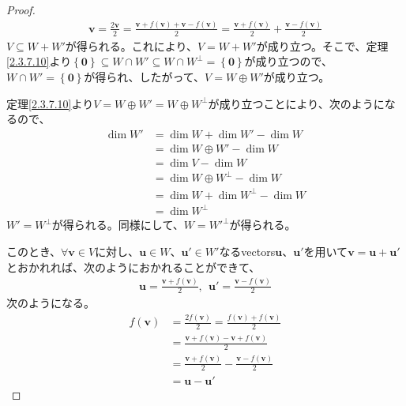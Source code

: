 \documentclass[dvipdfmx]{jsarticle}
\begin{document}
\begin{proof}
\begin{align*}
\mathbf{v} = \frac{2\mathbf{v}}{2} = \frac{\mathbf{v} + f\left( \mathbf{v} \right) + \mathbf{v} - f\left( \mathbf{v} \right)}{2} = \frac{\mathbf{v} + f\left( \mathbf{v} \right)}{2} + \frac{\mathbf{v} - f\left( \mathbf{v} \right)}{2}
\end{align*}
$V \subseteq W + W'$が得られる。これにより、$V = W + W'$が成り立つ。そこで、定理\ref{2.3.7.10}より$\left\{ \mathbf{0} \right\} \subseteq W \cap W' \subseteq W \cap W^{\bot} = \left\{ \mathbf{0} \right\}$が成り立つので、$W \cap W' = \left\{ \mathbf{0} \right\}$が得られ、したがって、$V = W \oplus W'$が成り立つ。\par
定理\ref{2.3.7.10}より$V = W \oplus W' = W \oplus W^{\bot}$が成り立つことにより、次のようになるので、
\begin{align*}
\dim W' &= \dim W + \dim W' - \dim W\\
&= \dim{W \oplus W'} - \dim W\\
&= \dim V - \dim W\\
&= \dim{W \oplus W^{\bot}} - \dim W\\
&= \dim W + \dim W^{\bot} - \dim W\\
&= \dim W^{\bot}
\end{align*}
$W' = W^{\bot}$が得られる。同様にして、$W = {W'}^{\bot}$が得られる。\par
このとき、$\forall\mathbf{v} \in V$に対し、$\mathbf{u} \in W$、$\mathbf{u}' \in W'$なるvectors$\mathbf{u}$、$\mathbf{u}'$を用いて$\mathbf{v} = \mathbf{u} + \mathbf{u}'$とおかれれば、次のようにおかれることができて、
\begin{align*}
\mathbf{u} = \frac{\mathbf{v} + f\left( \mathbf{v} \right)}{2},\ \ \mathbf{u}' = \frac{\mathbf{v} - f\left( \mathbf{v} \right)}{2}
\end{align*}
次のようになる。
\begin{align*}
f\left( \mathbf{v} \right) &= \frac{2f\left( \mathbf{v} \right)}{2} = \frac{f\left( \mathbf{v} \right) + f\left( \mathbf{v} \right)}{2}\\
&= \frac{\mathbf{v} + f\left( \mathbf{v} \right) - \mathbf{v} + f\left( \mathbf{v} \right)}{2}\\
&= \frac{\mathbf{v} + f\left( \mathbf{v} \right)}{2} - \frac{\mathbf{v} - f\left( \mathbf{v} \right)}{2}\\
&= \mathbf{u} - \mathbf{u}'
\end{align*}
\end{proof}
\end{document}
